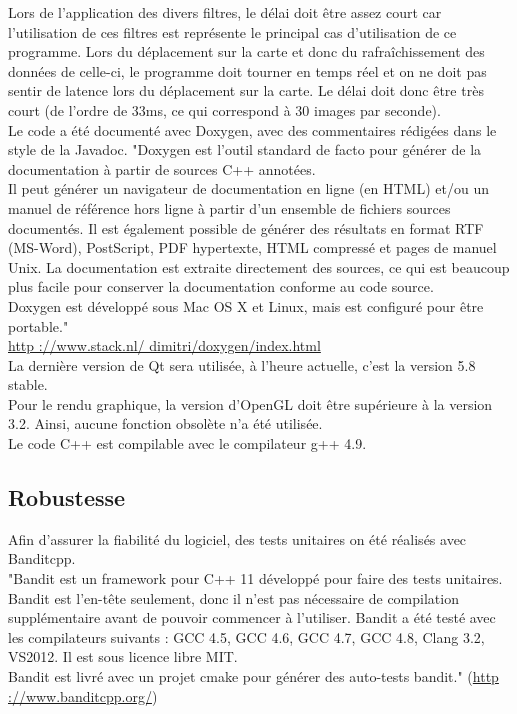 \documentclass[12pt]{article}
\begin{document}
		Lors de l’application des divers filtres, le délai doit être assez court car l'utilisation
		de ces filtres est représente le principal cas d'utilisation de ce programme.
		Lors du déplacement sur la carte et donc du rafraîchissement des données de celle-ci,
		le programme doit tourner en temps réel et on ne doit pas sentir de latence lors du
		déplacement sur la carte. Le délai doit donc être très court (de l'ordre de 33ms, ce qui
		correspond à 30 images par seconde).\\
		Le code a été documenté avec Doxygen, avec des commentaires rédigées dans le style de la Javadoc.
		"Doxygen est l’outil standard de facto pour générer de la documentation à partir de
		sources C++ annotées.\\
		Il peut générer un navigateur de documentation en ligne (en HTML) et/ou un manuel de
		référence hors ligne à partir d’un ensemble de fichiers sources documentés. Il est
		également possible de générer des résultats en format RTF (MS-Word), PostScript,
		PDF hypertexte, HTML compressé et pages de manuel Unix. La documentation est 
		extraite directement des sources, ce qui est beaucoup plus facile pour conserver
		la documentation conforme au code source. \\
		Doxygen est développé sous Mac OS X et Linux, mais est configuré pour être
		portable."\\
		
		\url{http ://www.stack.nl/ dimitri/doxygen/index.html} \\
		
		La dernière version de Qt sera utilisée, à l’heure actuelle, c’est la version
		5.8 stable.\\
		Pour le rendu graphique, la version d’OpenGL doit être supérieure à la version 3.2.
		Ainsi, aucune fonction obsolète n'a été utilisée.\\
		Le code C++ est compilable avec le compilateur g++ 4.9.
		
		\subsection{Robustesse}
		Afin d’assurer la fiabilité du logiciel, des tests unitaires on été réalisés avec
		Banditcpp.\\
		"Bandit est un framework pour C++ 11 développé pour faire des tests unitaires. Bandit est
		l’en-tête seulement, donc il n’est pas nécessaire de compilation supplémentaire avant de
		pouvoir commencer à l’utiliser. Bandit a été testé avec les compilateurs suivants :
		GCC 4.5, GCC 4.6, GCC 4.7, GCC 4.8, Clang 3.2, VS2012.
		Il est sous licence libre MIT. \\
		Bandit est livré avec un projet cmake pour générer des auto-tests bandit."
		(\url{http ://www.banditcpp.org/})\\
		
\end{document}
